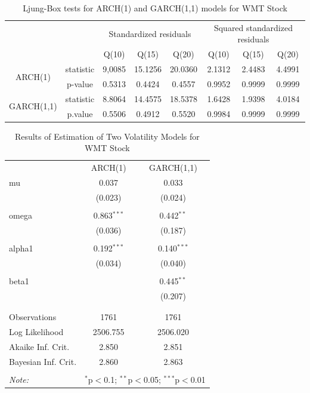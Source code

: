 \documentclass[paper=a4, fontsize=13pt]{article}
\begin{document}
\begin{table}[!htbp] \centering 
  \caption{Ljung-Box tests for ARCH(1) and GARCH(1,1) models for WMT Stock} 
  \label{} 
\begin{tabular}{cc|cccccc} 
\\[-1.8ex]\hline 
\hline
& & \multicolumn{3}{c}{Standardized residuals} & \multicolumn{3}{c}{Squared standardized residuals} \\
& & Q(10) & Q(15) & Q(20) & Q(10) & Q(15) & Q(20) \\
\hline 
\multirow{2}{*}{ARCH(1)} & statistic & 9,0085 & 15.1256 & 20.0360 & 2.1312 & 2.4483 & 4.4991 \\
& p-value & 0.5313 & 0.4424 & 0.4557 & 0.9952 & 0.9999 & 0.9999 \\
\multirow{2}{*}{GARCH(1,1)} & statistic & 8.8064 & 14.4575 & 18.5378 & 1.6428 & 1.9398 & 4.0184 \\
& p.value & 0.5506 & 0.4912 & 0.5520 & 0.9984 & 0.9999 & 0.9999 \\
\hline
\hline 
\end{tabular} 
\end{table} 

\begin{table}[!htbp] \centering 
  \caption{Results of Estimation of Two Volatility Models for WMT Stock} 
  \label{} 
\begin{tabular}{@{\extracolsep{5pt}}lcc} 
\\[-1.8ex]\hline 
\hline
 & ARCH(1) & GARCH(1,1) \\ 
 mu & 0.037 & 0.033 \\ 
  & (0.023) & (0.024) \\ 
  & & \\ 
 omega & 0.863$^{***}$ & 0.442$^{**}$ \\ 
  & (0.036) & (0.187) \\ 
  & & \\ 
 alpha1 & 0.192$^{***}$ & 0.140$^{***}$ \\ 
  & (0.034) & (0.040) \\ 
  & & \\ 
 beta1 &  & 0.445$^{**}$ \\ 
  &  & (0.207) \\ 
  & & \\ 
\hline \\[-1.8ex] 
Observations & 1761 & 1761 \\ 
Log Likelihood & 2506.755 & 2506.020 \\ 
Akaike Inf. Crit. & 2.850 & 2.851 \\ 
Bayesian Inf. Crit. & 2.860 & 2.863 \\ 
\hline 
\hline \\[-1.8ex] 
\textit{Note:}  & \multicolumn{2}{r}{$^{*}$p$<$0.1; $^{**}$p$<$0.05; $^{***}$p$<$0.01} \\ 
\end{tabular} 
\end{table} 
\end{document}
